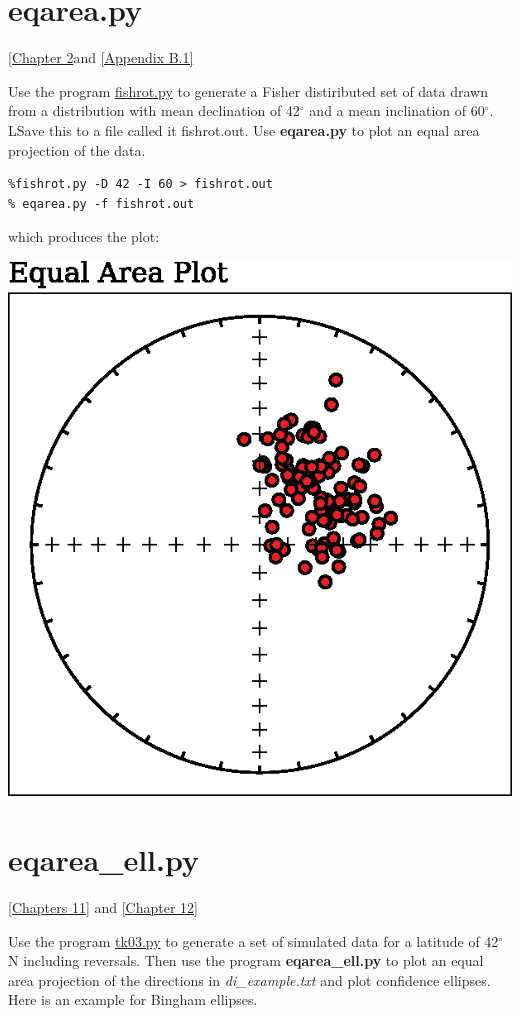 \documentclass[11pt]{book}
\begin{document}
{{{{\section {\bf eqarea.py}
\href{http://Webbook2.html#The_geomagnetic_field}{ [Chapter 2}and 
\href{http://Webbook2.html#Plots_useful_in_paleomagnetism}{[Appendix B.1]}

Use the program \href{#fishrot.py}{fishrot.py} to generate a Fisher distiributed set of data drawn from a distribution with mean declination of 42$^{\circ}$ and a mean inclination of 60$^{\circ}$.  LSave this to a file called {it fishrot.out}.   Use {\bf eqarea.py} to 
plot an equal area projection of the data.

\begin{verbatim}
%fishrot.py -D 42 -I 60 > fishrot.out
% eqarea.py -f fishrot.out
\end{verbatim}

\noindent
which produces the plot:

\includegraphics[width=10 cm]{EPSfiles/eqarea.eps}

\section {\bf eqarea\_ell.py}
\href{http://Webbook2.html#Fisher_statistics}{ [Chapters 11]} and \href{http://Webbook2.html#Beyond_Fisher_statistics}{ [Chapter 12]}

Use the program \href{#tk03.py}{tk03.py} to generate a set of simulated data for a latitude of 42$^{\circ}$N including reversals.  
Then use the program {\bf eqarea\_ell.py} to 
plot an equal area projection of the directions in {\it di\_example.txt} and plot confidence ellipses.  Here is an example for
Bingham ellipses.  


}}}}
\end{document}
